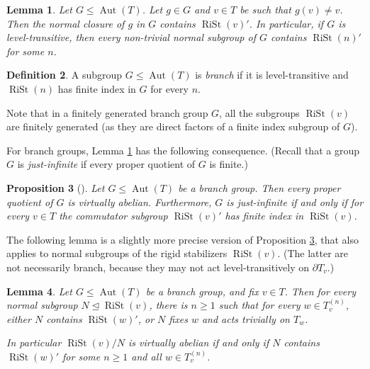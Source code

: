 \documentclass[11pt]{amsart}
\newcommand{\aut}{\ensuremath{\operatorname{Aut}}}%
\newcommand{\rist}{\ensuremath{\operatorname{RiSt}}}%
\theoremstyle{definition}
\newtheorem{defin}{Definition}[section]
\theoremstyle{plain}
\newtheorem{main thm}{Theorem}
\newtheorem{prop}[defin]{Proposition}
\newtheorem{lemma}[defin]{Lemma}
\theoremstyle{remark}
\theoremstyle{plain}
\begin{document}
 \begin{lemma}  \label{l-double-comm}
     Let $G\le \aut(T)$. Let $g\in G$ and $v\in T$ be such that $g(v)\neq v$. Then the normal closure of $g$ in $G$ contains $\rist(v)'$. 
     In particular, if $G$ is level-transitive, then every non-trivial normal subgroup of $G$ contains $\rist(n)'$ for some $n$. 
 \end{lemma}

 \begin{defin}
     
 A subgroup $G\le \aut(T)$  is \emph{branch} if it is level-transitive and $\rist(n)$ has finite index in $G$ for every $n$. 

  \end{defin}

Note that in a finitely generated branch group $G$, all the subgroups $
\rist(v)$ are finitely generated (as they are direct factors of a finite index subgroup of $G$). 

For branch groups,  Lemma \ref{l-double-comm} has the following consequence. (Recall that a group $G$ is \emph{just-infinite} if every proper quotient of $G$ is finite.)
  

\begin{prop}[\cite{Gri-branch}] \label{p-Grigorchuk}
Let $G\le \aut(T)$ be a branch group. Then every proper quotient of $G$ is virtually abelian. 
Furthermore, $G$ is just-infinite if and only if for every $v\in T$ the commutator subgroup $\rist(v)'$ has finite index in $\rist(v)$. 
\end{prop}

The following lemma is a slightly more precise version of Proposition \ref{p-Grigorchuk}, that also applies to normal subgroups of the rigid stabilizers $\rist(v)$. (The latter are not necessarily branch, because they may not act level-transitively on $\partial T_v$.) 

\begin{lemma} \label{l-quotient-rist}
    Let $G\le \aut(T)$ be a branch group, and fix $v\in T$. Then for every normal subgroup $N\unlhd \rist(v)$, there is $n\ge 1$ such that for every  $w\in T^{(n)}_v$, either $N$ contains $\rist(w)'$, or $N$ fixes $w$ and acts trivially on $T_w$.

    In particular $\rist(v)/N$ is virtually abelian if and only if $N$ contains $\rist(w)'$ for some $n\ge 1$ and all $w\in T^{(n)}_v$. 
\end{lemma}
\end{document}
